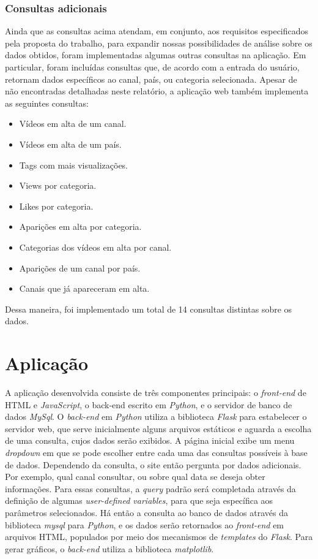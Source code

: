 \subsection{Consultas adicionais}

  Ainda que as consultas acima atendam, em conjunto, aos requisitos especificados pela proposta do trabalho, para expandir nossas
  possibilidades de análise sobre os dados obtidos, foram implementadas algumas outras consultas na aplicação. Em particular,
  foram incluídas consultas que, de acordo com a entrada do usuário, retornam dados específicos ao canal, país, ou categoria
  selecionada. Apesar de não encontradas detalhadas neste relatório, a aplicação web também implementa as seguintes consultas:
  \begin{itemize}
    \item Vídeos em alta de um canal.
    \item Vídeos em alta de um país.
    \item Tags com mais visualizações.
    \item Views por categoria.
    \item Likes por categoria.
    \item Aparições em alta por categoria.
    \item Categorias dos vídeos em alta por canal.
    \item Aparições de um canal por país.
    \item Canais que já apareceram em alta.
  \end{itemize}

  Dessa maneira, foi implementado um total de 14 consultas distintas sobre os dados.

\chapter{Aplicação}

  A aplicação desenvolvida consiste de três componentes principais: o \emph{front-end} de HTML e \emph{JavaScript},
  o back-end escrito em \emph{Python}, e o servidor de banco de dados \emph{MySql}. O \emph{back-end} em \emph{Python}
  utiliza a biblioteca
  \emph{Flask} para estabelecer o servidor web, que serve inicialmente alguns arquivos estáticos e aguarda a escolha de uma
  consulta, cujos dados serão exibidos. A página inicial exibe um menu \emph{dropdown} em que se pode escolher entre cada
  uma das consultas possíveis à base de dados. Dependendo da consulta, o site então pergunta por dados adicionais. Por exemplo,
  qual canal consultar, ou sobre qual data se deseja obter informações. Para essas consultas, a \emph{query} padrão será
  completada através da definição de algumas \emph{user-defined variables}, para que seja específica aos parâmetros
  selecionados. Há então a consulta ao banco de dados através da biblioteca \emph{mysql} para \emph{Python}, e os dados
  serão retornados ao \emph{front-end} em arquivos HTML, populados por meio dos mecanismos de \emph{templates} do \emph{Flask}.
  Para gerar gráficos, o \emph{back-end} utiliza a biblioteca \emph{matplotlib}.

